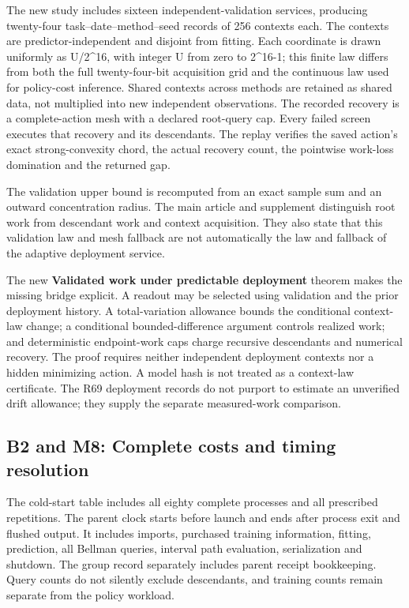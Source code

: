 \documentclass[ecta,nameyear,draft]{econsocart}
\begin{document}
The new study includes sixteen independent-validation services,
producing twenty-four task--date--method--seed records of 256 contexts
each. The contexts are predictor-independent and disjoint from fitting.
Each coordinate is drawn uniformly as U/2\^{}16, with integer U from
zero to 2\^{}16-1; this finite law differs from both the full
twenty-four-bit acquisition grid and the continuous law used for
policy-cost inference. Shared contexts across methods are retained as
shared data, not multiplied into new independent observations. The
recorded recovery is a complete-action mesh with a declared root-query
cap. Every failed screen executes that recovery and its descendants. The
replay verifies the saved action's exact strong-convexity chord, the
actual recovery count, the pointwise work-loss domination and the
returned gap.

The validation upper bound is recomputed from an exact sample sum and an
outward concentration radius. The main article and supplement
distinguish root work from descendant work and context acquisition. They
also state that this validation law and mesh fallback are not
automatically the law and fallback of the adaptive deployment service.

The new \textbf{Validated work under predictable deployment} theorem
makes the missing bridge explicit. A readout may be selected using
validation and the prior deployment history. A total-variation allowance
bounds the conditional context-law change; a conditional
bounded-difference argument controls realized work; and deterministic
endpoint-work caps charge recursive descendants and numerical recovery.
The proof requires neither independent deployment contexts nor a hidden
minimizing action. A model hash is not treated as a context-law
certificate. The R69 deployment records do not purport to estimate an
unverified drift allowance; they supply the separate measured-work
comparison.

\hypertarget{b2-and-m8-complete-costs-and-timing-resolution}{%
\subsection{B2 and M8: Complete costs and timing
resolution}\label{b2-and-m8-complete-costs-and-timing-resolution}}

The cold-start table includes all eighty complete processes and all
prescribed repetitions. The parent clock starts before launch and ends
after process exit and flushed output. It includes imports, purchased
training information, fitting, prediction, all Bellman queries, interval
path evaluation, serialization and shutdown. The group record separately
includes parent receipt bookkeeping. Query counts do not silently
exclude descendants, and training counts remain separate from the policy
workload.
\end{document}
